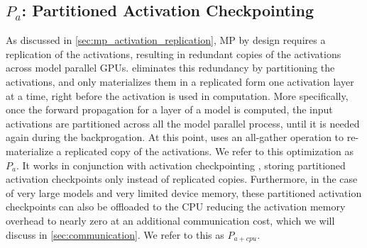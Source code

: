 \subsection{$P_a$: Partitioned Activation Checkpointing}
\label{sec:p_a}
As discussed in \ref{sec:mp_activation_replication}, MP by design requires a replication of the activations, resulting in redundant copies of the activations across model parallel GPUs. \name eliminates this redundancy by partitioning the activations, and only materializes them in a replicated form one activation layer at a time, right before the activation is used in computation. More specifically, once the forward propagation for a layer of a model is computed, the input activations are partitioned across all the model parallel process, until it is needed again during the backprogation. At this point, \name uses an all-gather operation to re-materialize a replicated copy of the activations. We refer to this optimization as $P_a$. It works in conjunction with activation checkpointing \cite{DBLP:journals/corr/ChenXZG16}, storing partitioned activation checkpoints only instead of replicated copies. Furthermore, in the case of very large models and very limited device memory, these partitioned activation checkpoints can also be offloaded to the CPU reducing the activation memory overhead to nearly zero at an additional communication cost, which we will discuss in \ref{sec:communication}. We refer to this as $P_{a+cpu}$. 
